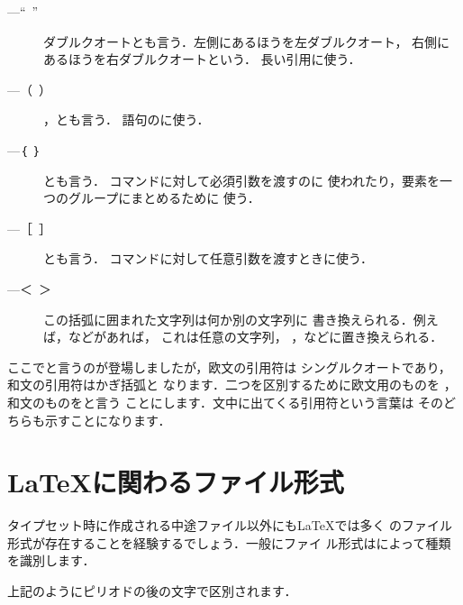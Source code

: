 {{{{{\begin{description}
 \item[---“~”] 
	    ダブルクオートとも言う．左側にあるほうを左ダブルクオート，
	    右側にあるほうを右ダブルクオートという．
	    長い引用に使う．
 \item[---（~）] ，とも言う．
	    語句のに使う．
 \item[---｛~｝] とも言う．
	    コマンドに対して必須引数を渡すのに
	    使われたり，要素を一つのグループにまとめるために
	    使う．
 \item[---［~］] とも言う．
	    コマンドに対して任意引数を渡すときに使う．
 \item[---＜~＞] 
	    この括弧に囲まれた文字列は何か別の文字列に
	    書き換えられる．例えば，などがあれば，
	    これは任意の文字列，
	    ，などに置き換えられる．
\end{description}
%
%
%
%
ここでと言うのが登場しましたが，欧文の引用符は
シングルクオートであり，和文の引用符はかぎ括弧と
なります．二つを区別するために欧文用のものを
，和文のものをと言う
ことにします．文中に出てくる引用符という言葉は
そのどちらも示すことになります．


\section{{\protect\LaTeX}に関わるファイル形式}
タイプセット時に作成される中途ファイル以外にも{\LaTeX}では多く
のファイル形式が存在することを経験するでしょう．一般にファイ
ル形式はによって種類を識別します．

\begin{Syntax}
\end{Syntax}

上記のようにピリオドの後の文字で区別されます．

}}}}}
